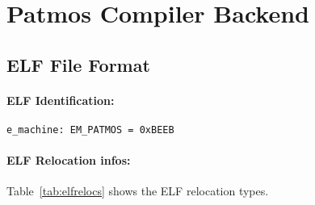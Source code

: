 %



\section{Patmos Compiler Backend}
\label{sec:toolchain:backend}

\subsection{ELF File Format}

\paragraph{ELF Identification:}

\begin{verbatim}
e_machine: EM_PATMOS = 0xBEEB
\end{verbatim}

\paragraph{ELF Relocation infos:}
Table~\ref{tab:elfrelocs} shows the ELF relocation types.

